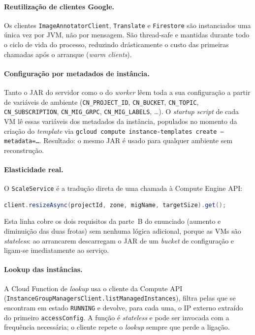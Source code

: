 \documentclass[11pt,a4paper]{article}
\begin{document}
\paragraph{Reutiliza\c{c}\~ao de clientes Google.}
Os clientes \texttt{ImageAnnotatorClient}, \texttt{Translate} e
\texttt{Firestore} s\~ao instanciados uma \'unica vez por JVM, n\~ao por
mensagem. S\~ao thread-safe e mantidas durante todo o ciclo de vida do
processo, reduzindo dr\'asticamente o custo das primeiras chamadas
ap\'os o arranque (\emph{warm clients}).

\paragraph{Configura\c{c}\~ao por metadados de inst\^ancia.}
Tanto o JAR do servidor como o do \emph{worker} l\^eem toda a sua
configura\c{c}\~ao a partir de vari\'aveis de ambiente (\texttt{CN\_PROJECT\_ID},
\texttt{CN\_BUCKET}, \texttt{CN\_TOPIC}, \texttt{CN\_SUBSCRIPTION},
\texttt{CN\_MIG\_GRPC}, \texttt{CN\_MIG\_LABELS}, \dots). O \emph{startup
script} de cada VM l\^e essas vari\'aveis dos metadados da inst\^ancia,
populados no momento da cria\c{c}\~ao do \emph{template} via
\texttt{gcloud compute instance-templates create --metadata=\dots}.
Resultado: o mesmo JAR \'e usado para qualquer ambiente sem reconstru\c{c}\~ao.

\paragraph{Elasticidade real.}
O \texttt{ScaleService} \'e a tradu\c{c}\~ao direta de uma chamada \`a Compute
Engine API:
\begin{lstlisting}[language=Java]
client.resizeAsync(projectId, zone, migName, targetSize).get();
\end{lstlisting}
Esta linha cobre os dois requisitos da parte~B do enunciado (aumento e
diminui\c{c}\~ao das duas frotas) sem nenhuma l\'ogica adicional, porque
as VMs s\~ao \emph{stateless}: ao arrancarem descarregam o JAR de um
\emph{bucket} de configura\c{c}\~ao e ligam-se imediatamente ao servi\c{c}o.

\paragraph{Lookup das inst\^ancias.}
A Cloud Function de \emph{lookup} usa o cliente da Compute API
(\texttt{InstanceGroupManagersClient.listManagedInstances}), filtra
pelas que se encontram em estado \texttt{RUNNING} e devolve, para cada
uma, o IP externo extra\'ido do primeiro \texttt{accessConfig}.
A fun\c{c}\~ao \'e \emph{stateless} e pode ser invocada com a frequ\^encia
necess\'aria; o cliente repete o \emph{lookup} sempre que perde a liga\c{c}\~ao.
\end{document}
